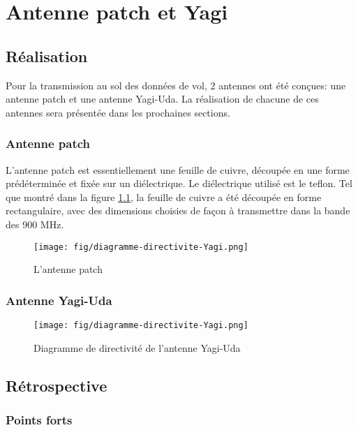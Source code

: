 \chapter{Antenne patch et Yagi}
\label{chap:antennes}

\section{Réalisation}

Pour la transmission au sol des données de vol, 2 antennes ont été conçues: une
antenne patch et une antenne Yagi-Uda. La réalisation de chacune de ces
antennes sera présentée dans les prochaines sections.

\subsection{Antenne patch}

L'antenne patch est essentiellement une feuille de cuivre, découpée en une
forme prédéterminée et fixée sur un diélectrique. Le diélectrique utilisé est
le teflon. Tel que montré dans la figure \ref{f:antenne_patch}, la feuille de
cuivre a été découpée en forme rectangulaire, avec des dimensions choisies de
façon à transmettre dans la bande des 900 MHz.

\begin{figure}[H]
	\center
	\texttt{[image: fig/diagramme-directivite-Yagi.png]}
	\caption{L'antenne patch}
	\label{f:antenne_patch}
\end{figure}

\subsection{Antenne Yagi-Uda}



\begin{figure}[H]
	\center
	\texttt{[image: fig/diagramme-directivite-Yagi.png]}
	\caption{Diagramme de directivité de l'antenne Yagi-Uda}
	\label{f:diagramme_directivite_yagi}
\end{figure}

\section{Rétrospective}

\subsection{Points forts}

